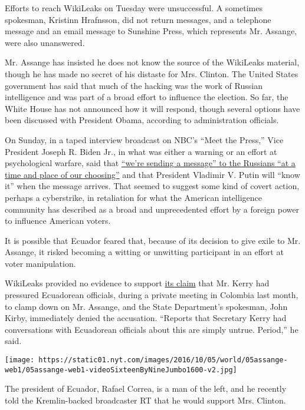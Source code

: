 Efforts to reach WikiLeaks on Tuesday were unsuccessful. A sometimes
spokesman, Kristinn Hrafnsson, did not return messages, and a telephone
message and an email message to Sunshine Press, which represents Mr.
Assange, were also unanswered.

Mr. Assange has insisted he does not know the source of the WikiLeaks
material, though he has made no secret of his distaste for Mrs. Clinton.
The United States government has said that much of the hacking was the
work of Russian intelligence and was part of a broad effort to influence
the election. So far, the White House has not announced how it will
respond, though several options have been discussed with President
Obama, according to administration officials.

On Sunday, in a taped interview broadcast on NBC's ``Meet the Press,''
Vice President Joseph R. Biden Jr., in what was either a warning or an
effort at psychological warfare, said that
\href{http://www.nytimes.com/2016/10/16/us/politics/biden-hints-at-us-response-to-cyberattacks-blamed-on-russia.html}{``we're
sending a message'' to the Russians ``at a time and place of our
choosing''} and that President Vladimir V. Putin will ``know it'' when
the message arrives. That seemed to suggest some kind of covert action,
perhaps a cyberstrike, in retaliation for what the American intelligence
community has described as a broad and unprecedented effort by a foreign
power to influence American voters.

It is possible that Ecuador feared that, because of its decision to give
exile to Mr. Assange, it risked becoming a witting or unwitting
participant in an effort at voter manipulation.

WikiLeaks provided no evidence to support
\href{https://twitter.com/wikileaks/status/788369924175441920}{its
claim} that Mr. Kerry had pressured Ecuadorean officials, during a
private meeting in Colombia last month, to clamp down on Mr. Assange,
and the State Department's spokesman, John Kirby, immediately denied the
accusation. ``Reports that Secretary Kerry had conversations with
Ecuadorean officials about this are simply untrue. Period,'' he said.

\texttt{[image: https://static01.nyt.com/images/2016/10/05/world/05assange-web1/05assange-web1-videoSixteenByNineJumbo1600-v2.jpg]}

The president of Ecuador, Rafael Correa, is a man of the left, and he
recently told the Kremlin-backed broadcaster RT that he would support
Mrs. Clinton.


